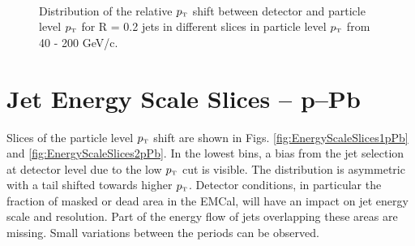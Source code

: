 \documentclass[ALICE]{ALICE_analysis_notes}
\newcommand{\pT}{$p_{\mbox{\tiny T}}$\xspace}
\begin{document}
\begin{appendix}
\begin{figure}[h!]
    \qquad
    \\
    \qquad
    \caption{Distribution of the relative \pT shift between detector and particle level \pT for R = 0.2 jets in different slices in particle level \pT from 40 - 200 GeV/c.}
    \label{fig:EnergyScaleSlices2}
\end{figure}

\newpage

\section{Jet Energy Scale Slices -- p--Pb}
\label{sec:AppendixJESpPb}

Slices of the particle level \pT shift are shown in Figs. \ref{fig:EnergyScaleSlices1pPb} and \ref{fig:EnergyScaleSlices2pPb}. In the lowest bins, a bias from the jet selection at detector level due to the low \pT cut is visible. The distribution is asymmetric with a tail shifted towards higher \pT. Detector conditions, in particular the fraction of masked or dead area in the EMCal, will have an impact on jet energy scale and resolution. Part of the energy flow of jets overlapping these areas are missing. Small variations between the periods can be observed.


\end{appendix}
\end{document}
